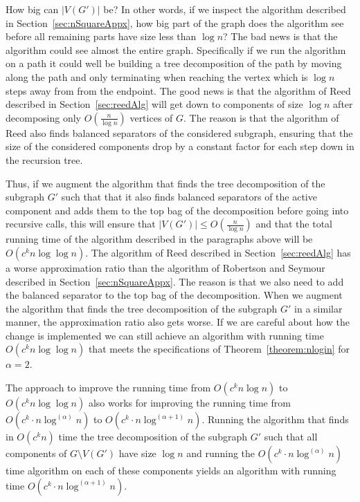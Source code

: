 \documentclass[a4paper,11pt]{article}
\theoremstyle{definition}
\theoremstyle{remark}
\newcommand{\depth}{\alpha}
\begin{document}
How big can $|V(G')|$ be? In other words, if we inspect the algorithm
described in Section~\ref{sec:nSquareAppx}, how big part of the graph
does the algorithm see before all remaining parts have size less than
$\log n$? The bad news is that the algorithm could see almost the
entire graph.  Specifically if we run the algorithm on a path it could
well be building a tree decomposition of the path by moving along the
path and only terminating when reaching the vertex which is $\log n$
steps away from from the endpoint.  The good news is that the
algorithm of Reed described in Section~\ref{sec:reedAlg} will get down
to components of size $\log n$ after decomposing only $O(\frac{n}{\log
  n})$ vertices of $G$.  The reason is that the algorithm of Reed also
finds balanced separators of the considered subgraph, ensuring that
the size of the considered components drop by a constant factor for
each step down in the recursion tree.

Thus, if we augment the algorithm that finds the tree decomposition of
the subgraph $G'$ such that that it also finds balanced separators of
the active component and adds them to the top bag of the decomposition
before going into recursive calls, this will ensure that $|V(G')| \leq
O(\frac{n}{\log n})$ and that the total running time of the algorithm
described in the paragraphs above will be $O(c^k n \log \log n)$.  The
algorithm of Reed described in Section~\ref{sec:reedAlg} has a worse
approximation ratio than the algorithm of Robertson and Seymour
described in Section~\ref{sec:nSquareAppx}.  The reason is that we
also need to add the balanced separator to the top bag of the
decomposition.  When we augment the algorithm that finds the tree
decomposition of the subgraph $G'$ in a similar manner, the
approximation ratio also gets worse.  If we are careful about how the
change is implemented we can still achieve an algorithm with running
time $O(c^k n \log \log n)$ that meets the specifications of
Theorem~\ref{theorem:nlogin} for $\depth = 2$.

The approach to improve the running time from $O(c^k n \log n)$ to
$O(c^k n \log \log n)$ also works for improving the running time from
$O(c^k\cdot n \log^{(\depth)} n)$ to $O(c^k\cdot n \log^{(\depth{}+1)}
n)$.  Running the algorithm that finds in $O(c^kn)$ time the tree
decomposition of the subgraph $G'$ such that all components of $G
\setminus V(G')$ have size $\log n$ and running the $O(c^k\cdot n
\log^{(\depth)} n)$ time algorithm on each of these components yields
an algorithm with running time $O(c^k\cdot n \log^{(\depth{}+1)} n)$.
\end{document}
